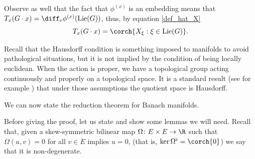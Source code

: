 Observe as well that the fact that \(\phi^{(x)}\) is an embedding means that \(T_{x}(G \cdot x)=\diff_e\phi^{(x)}(\mathrm{Lie}(G))\), thus, by equation \eqref{def_hat_X}
\begin{equation} \label{eq_tang_orbit}
T_x(G \cdot x)=\corch{X_{\xi}: \xi \in \mathrm{Lie}(G)}.
\end{equation}

\begin{obs}
    Recall that the Hausdorff condition is something imposed to manifolds to avoid pathological situations, but it is not implied by the condition of being locally euclidean. When the action is proper, we have a topological group acting continuously and properly on a topological space. It is a standard result (see for example \parencite[Prop. 21.4]{lee_introSM}) that under those assumptions the quotient space is Hausdorff.
\end{obs}

We can now state the reduction theorem for Banach manifolds.


Before giving the proof, let us state and show some lemmas we will need. Recall that, given a skew-symmetric bilinear map \(\Omega\colon E \times E \to \R\) such that \(\Omega(u,v)=0\) for all \(v \in E\) implies \(u=0\), (that is, \(\ker \Omega^\flat=\corch{0}\)) we say that it is non-degenerate. 

